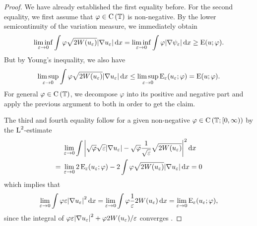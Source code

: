 \begin{proof}
	We have already established the first equality before. For the second 
	equality, we first assume that $ \varphi \in \operatorname{C} \left( \operatorname{\mathbb{T}}  
	\right) $ is non-negative.
	By the lower semicontinuity of the variation measure, we immediately obtain
	\begin{equation*}
		\liminf_{ \varepsilon \to 0 }
		\int
		\varphi
		\sqrt{ 2 W ( u_{ \varepsilon } ) }
		\abs{ \nabla u_{ \varepsilon } }
		\dd{ x }
		=
		\liminf_{ \varepsilon \to 0 }
		\int
		\varphi
		\abs{ \nabla \psi_{ \varepsilon } }
		\dd{ x }
		\geq
		\operatorname{E} ( u ; \varphi ).
	\end{equation*}
	But by Young's inequality, we also have 
	\begin{equation*}
		\limsup_{ \varepsilon \to 0 }
		\int
		\varphi
		\sqrt{ 2 W ( u_{ \varepsilon } ) }
		\abs{ \nabla u_{ \varepsilon } }
		\dd{ x }
		\leq
		\limsup_{ \varepsilon \to 0 }
		\operatorname{E}_{ \varepsilon } ( u_{ \varepsilon } ; \varphi )
		= \operatorname{E} ( u ; \varphi ).
	\end{equation*}
	For general $ \varphi \in \operatorname{C} \left( \operatorname{\mathbb{T}} \right) $, we decompose $ 
	\varphi $ into its positive and negative part and apply the previous 
	argument to both in order to get the claim.
	
	The third and fourth equality follow for a given non-negative $ \varphi 
	\in \operatorname{C} \left( \operatorname{\mathbb{T}} ; [ 0 , \infty ) \right) $ by the 
	$ \operatorname{L}^{ 2 } $-estimate
	\begin{align*}
		& \lim_{ \varepsilon \to 0 }
		\int
		\abs{ \sqrt{ \varphi } \sqrt{ \varepsilon } \abs{ \nabla u_{ 
					\varepsilon } } - \sqrt{ \varphi } \frac{ 1 }{ \sqrt{ 
					\varepsilon } } 
			\sqrt{ 2 W ( u_{ \varepsilon } ) } }^{ 2 }
		\dd{ x }
		\\
		={} &
		\lim_{ \varepsilon \to 0 }
		2 \operatorname{E}_{ \varepsilon } ( u_{ \varepsilon } ; \varphi )
		-
		2 \int	
		\varphi
		\sqrt{ 2 W ( u_{ \varepsilon } ) }
		\abs{ \nabla u_{ \varepsilon } }
		\dd{ x }
		=
		0
	\end{align*}
	which implies that 
	\begin{equation*}
		\lim_{ \varepsilon \to 0 }
		\int
		\varphi
		\varepsilon
		\abs{ \nabla u_{ \varepsilon } }^{ 2 }
		\dd{ x }
		=
		\lim_{ \varepsilon \to 0}
		\int
		\varphi
		\frac{ 1 }{ \varepsilon }
		2 W ( u_{ \varepsilon } )
		\dd{ x }
		=
		\lim_{ \varepsilon \to 0 }
		\operatorname{E}_{ \varepsilon } ( u_{ \varepsilon } ; \varphi ),
	\end{equation*}
	since the integral of $ 
	\varphi \varepsilon \abs{ \nabla u_{\varepsilon } }^{ 2 } + \varphi 2 W ( 
	u_{ \varepsilon } ) / \varepsilon $ converges .
\end{proof}


